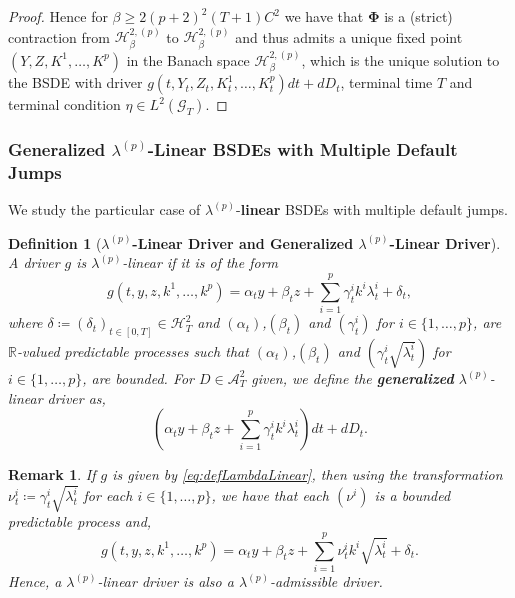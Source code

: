 \documentclass[11pt,a4paper]{article}
\numberwithin{equation}{section}
\theoremstyle{newPlain}
\theoremstyle{newDefinition}
\newtheorem{definition}[theorem]{Definition}
\theoremstyle{newRemark}
\newtheorem{remark}[theorem]{Remark}
\begin{document}
{\begin{proof}
    Hence for $\beta\ge2(p+2)^2(T+1)C^2$ we have that $\mathbf{\Phi}$ is a (strict) contraction from $\mathcal{H}_\beta^{2,(p)}$ to $\mathcal{H}_\beta^{2,(p)}$ and thus admits a unique fixed point $(Y,Z,K^1,\ldots,K^p)$ in the Banach space $\mathcal{H}_\beta^{2,(p)}$, which is the unique solution to the BSDE with driver $g(t,Y_t,Z_t,K_t^1,\ldots,K_t^p)dt + dD_t$, terminal time $T$ and terminal condition $\eta\in L^2(\mathcal{G}_T)$.
\end{proof}

\subsubsection{\texorpdfstring{Generalized $\lambda^{(p)}$-Linear BSDEs with Multiple Default Jumps}{lambda-p-Linear BSDEs with Multiple Default Jumps}}

We study the particular case of $\lambda^{(p)}$-\textbf{linear} BSDEs with multiple default jumps.
\begin{definition}[\textbf{$\lambda^{(p)}$-Linear Driver and Generalized $\lambda^{(p)}$-Linear Driver}]
    A driver $g$ is $\lambda^{(p)}$-linear if it is of the form
    \begin{equation}\label{eq:defLambdaLinear}
        g(t,y,z,k^1,\ldots,k^p)=\alpha_ty + \beta_tz + \sum_{i=1}^p\gamma_t^ik^i\lambda_t^i + \delta_t,
    \end{equation}
    where $\delta\coloneqq(\delta_t)_{t\in[0,T]}\in\mathcal{H}_T^2$ and $(\alpha_t)$,$(\beta_t)$ and $(\gamma_t^i)$ for $i\in\{1,\ldots,p\}$, are $\mathbb{R}$-valued predictable processes such that $(\alpha_t)$,$(\beta_t)$ and $(\gamma_t^i\sqrt{\lambda_t^i})$ for $i\in\{1,\ldots,p\}$, are bounded.
    For $D\in\mathcal{A}_T^2$ given, we define the \textbf{generalized} $\lambda^{(p)}$-linear driver as,
    \begin{equation}\label{eq:defLambdaLinear2}
        (\alpha_ty + \beta_tz + \sum_{i=1}^p\gamma_t^ik^i\lambda_t^i)dt + dD_t.
    \end{equation}
    
\end{definition}

\begin{remark}
    If $g$ is given by \eqref{eq:defLambdaLinear}, then using the transformation $\nu_t^i\coloneqq\gamma_t^i\sqrt{\lambda_t^i}$ for each $i\in\{1,\ldots,p\}$, we have that each $(\nu^i)$ is a bounded predictable process and,
    \begin{equation}
        g(t,y,z,k^1,\ldots,k^p) = \alpha_ty + \beta_tz + \sum_{i=1}^p\nu_t^ik^i\sqrt{\lambda_t^i} + \delta_t.
    \end{equation}
    Hence,  a $\lambda^{(p)}$-linear driver is also a $\lambda^{(p)}$-admissible driver.
\end{remark}

}
\end{document}
